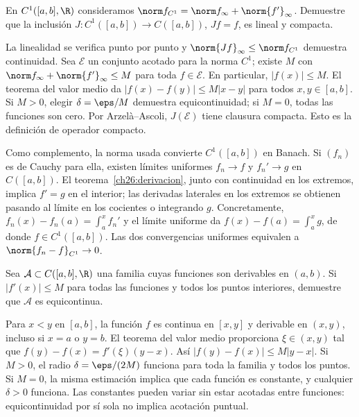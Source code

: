 \begin{ejercicio}
En $C^1([a,b],\R)$ consideramos $\norm f_{C^1}=\norm f_\infty+\norm{f'}_\infty$. Demuestre que la inclusión $J:C^1([a,b])\to C([a,b])$, $Jf=f$, es lineal y compacta.
\end{ejercicio}
\begin{solucion}
La linealidad se verifica punto por punto y $\norm{Jf}_\infty\le\norm f_{C^1}$ demuestra continuidad. Sea $\mathcal E$ un conjunto acotado para la norma $C^1$; existe $M$ con $\norm f_\infty+\norm{f'}_\infty\le M$ para toda $f\in\mathcal E$. En particular, $|f(x)|\le M$. El teorema del valor medio da
$|f(x)-f(y)|\le M|x-y|$ para todos $x,y\in[a,b]$. Si $M>0$, elegir $\delta=\eps/M$ demuestra equicontinuidad; si $M=0$, todas las funciones son cero. Por Arzelà--Ascoli, $J(\mathcal E)$ tiene clausura compacta. Esto es la definición de operador compacto.

Como complemento, la norma usada convierte $C^1([a,b])$ en Banach. Si $(f_n)$ es de Cauchy para ella, existen límites uniformes $f_n\to f$ y $f_n'\to g$ en $C([a,b])$. El teorema~\ref{ch26:derivacion}, junto con continuidad en los extremos, implica $f'=g$ en el interior; las derivadas laterales en los extremos se obtienen pasando al límite en los cocientes o integrando $g$. Concretamente, $f_n(x)-f_n(a)=\int_a^x f_n'$ y el límite uniforme da $f(x)-f(a)=\int_a^xg$, de donde $f\in C^1([a,b])$. Las dos convergencias uniformes equivalen a $\norm{f_n-f}_{C^1}\to0$.
\end{solucion}

\begin{ejercicio}
Sea $\mathcal A\subset C([a,b],\R)$ una familia cuyas funciones son derivables en $(a,b)$. Si $|f'(x)|\le M$ para todas las funciones y todos los puntos interiores, demuestre que $\mathcal A$ es equicontinua.
\end{ejercicio}
\begin{solucion}
Para $x<y$ en $[a,b]$, la función $f$ es continua en $[x,y]$ y derivable en $(x,y)$, incluso si $x=a$ o $y=b$. El teorema del valor medio proporciona $\xi\in(x,y)$ tal que $f(y)-f(x)=f'(\xi)(y-x)$. Así $|f(y)-f(x)|\le M|y-x|$. Si $M>0$, el radio $\delta=\eps/(2M)$ funciona para toda la familia y todos los puntos. Si $M=0$, la misma estimación implica que cada función es constante, y cualquier $\delta>0$ funciona. Las constantes pueden variar sin estar acotadas entre funciones: equicontinuidad por sí sola no implica acotación puntual.
\end{solucion}

